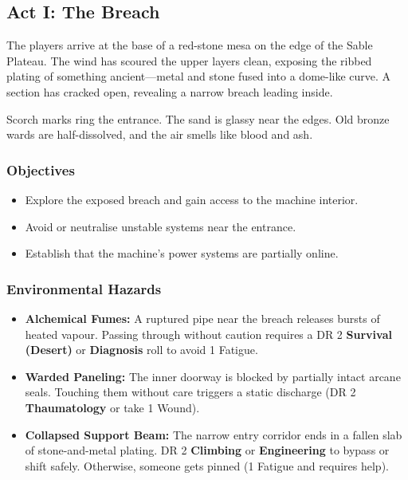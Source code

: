\subsection{Act I: The Breach}

The players arrive at the base of a red-stone mesa on the edge of the Sable Plateau. The wind has scoured the upper layers clean, exposing the ribbed plating of something ancient—metal and stone fused into a dome-like curve. A section has cracked open, revealing a narrow breach leading inside.

Scorch marks ring the entrance. The sand is glassy near the edges. Old bronze wards are half-dissolved, and the air smells like blood and ash.

\subsubsection*{Objectives}
\begin{itemize}
    \item Explore the exposed breach and gain access to the machine interior.
    \item Avoid or neutralise unstable systems near the entrance.
    \item Establish that the machine’s power systems are partially online.
\end{itemize}

\subsubsection*{Environmental Hazards}
\begin{itemize}
    \item \textbf{Alchemical Fumes:} A ruptured pipe near the breach releases bursts of heated vapour. Passing through without caution requires a DR 2 \textbf{Survival (Desert)} or \textbf{Diagnosis} roll to avoid 1 Fatigue.
    
    \item \textbf{Warded Paneling:} The inner doorway is blocked by partially intact arcane seals. Touching them without care triggers a static discharge (DR 2 \textbf{Thaumatology} or take 1 Wound).

    \item \textbf{Collapsed Support Beam:} The narrow entry corridor ends in a fallen slab of stone-and-metal plating. DR 2 \textbf{Climbing} or \textbf{Engineering} to bypass or shift safely. Otherwise, someone gets pinned (1 Fatigue and requires help).
\end{itemize}


